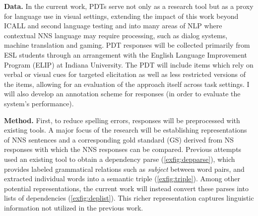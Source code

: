 \documentclass[11pt]{article}
\begin{document}
\noindent \textbf{Data.}
In the current work, PDTs serve not only as a research tool but as a proxy for language use in visual settings, extending the impact of this work beyond ICALL and second language testing and into many areas of NLP where contextual NNS language may require processing, such as dialog systems, machine translation and gaming.
PDT responses will be collected primarily from ESL students through an arrangement with the English Language Improvement Program (ELIP) at Indiana University. The PDT will include items which rely on verbal or visual cues for targeted elicitation as well as less restricted versions of the items, allowing for an evaluation of the approach itself across task settings. I will also develop an annotation scheme for responses (in order to evaluate the system's performance).

\noindent \textbf{Method.} First, to reduce spelling errors, responses will be preprocessed with existing tools. A major focus of the research will be establishing representations of NNS sentences and a corresponding gold standard (GS) derived from NS responses with which the NNS responses can be compared. Previous attempts used an existing tool \citep{demarneffe:ea:06, klein:manning:03} to obtain a dependency parse (\ref{exfig:depparse}), which provides labeled grammatical relations such as \textit{subject} between word pairs, and extracted individual words into a semantic triple (\ref{exfig:triple}). Among other potential representations, the current work will instead convert these parses into lists of dependencies (\ref{exfig:deplist}). This richer representation captures linguistic information not utilized in the previous work.
\end{document}
